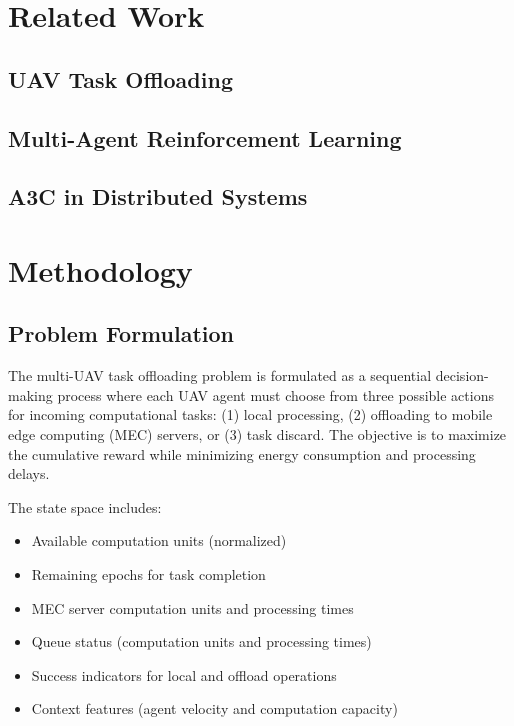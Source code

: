 \documentclass[journal]{IEEEtran}
\begin{document}
\section{Related Work}
\label{sec:related_work}

\subsection{UAV Task Offloading}

\subsection{Multi-Agent Reinforcement Learning}

\subsection{A3C in Distributed Systems}

\section{Methodology}
\label{sec:methodology}

\subsection{Problem Formulation}

The multi-UAV task offloading problem is formulated as a sequential decision-making process where each UAV agent must choose from three possible actions for incoming computational tasks: (1) local processing, (2) offloading to mobile edge computing (MEC) servers, or (3) task discard. The objective is to maximize the cumulative reward while minimizing energy consumption and processing delays.

The state space includes:
\begin{itemize}
\item Available computation units (normalized)
\item Remaining epochs for task completion
\item MEC server computation units and processing times
\item Queue status (computation units and processing times)
\item Success indicators for local and offload operations
\item Context features (agent velocity and computation capacity)
\end{itemize}
\end{document}
